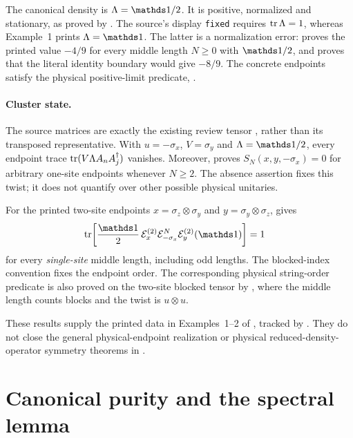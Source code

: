 \documentclass[11pt]{article}
\begin{document}
The canonical density is $\Lambda=\Id/2$. It is positive, normalized and
stationary, as proved by .
The source's display \texttt{fixed} requires $\operatorname{tr}\Lambda=1$, whereas
Example~1 prints $\Lambda=\Id$. The latter is a normalization error:
 proves the printed
value $-4/9$ for every middle length $N\geq0$ with $\Id/2$, and
proves that the literal identity boundary would give $-8/9$.
The concrete endpoints satisfy the physical positive-limit predicate,
.

\paragraph{Cluster state.}
The source matrices are exactly the existing review tensor
, rather than its transposed representative.
With $u=-\sigma_x$, $V=\sigma_y$ and $\Lambda=\Id/2$, every endpoint trace
$\operatorname{tr}(V\Lambda A_nA_j^\dagger)$ vanishes. Moreover,
 proves
$S_N(x,y,-\sigma_x)=0$ for arbitrary one-site endpoints whenever $N\geq2$.
The absence assertion fixes this twist; it does not quantify over other
possible physical unitaries.

For the printed two-site endpoints $x=\sigma_z\otimes\sigma_y$ and
$y=\sigma_y\otimes\sigma_z$,
 gives
\begin{align}
    \tr\!\left[\frac{\Id}{2}\,
        \mathcal E_x^{(2)}\mathcal E_{-\sigma_x}^{N}
    \mathcal E_y^{(2)}(\Id)\right] & =1
\end{align}
for every \emph{single-site} middle length, including odd lengths.
The blocked-index convention fixes the endpoint order. The corresponding
physical string-order predicate is also proved on the two-site blocked tensor
by , where the
middle length counts blocks and the twist is $u\otimes u$.

These results supply the printed data in Examples~1--2 of
\cite[lines~392--411]{PerezGarcia2008StringOrder}, tracked by .
They do not close the general physical-endpoint realization or physical
reduced-density-operator symmetry theorems in .

\section{Canonical purity and the spectral lemma}
\end{document}
